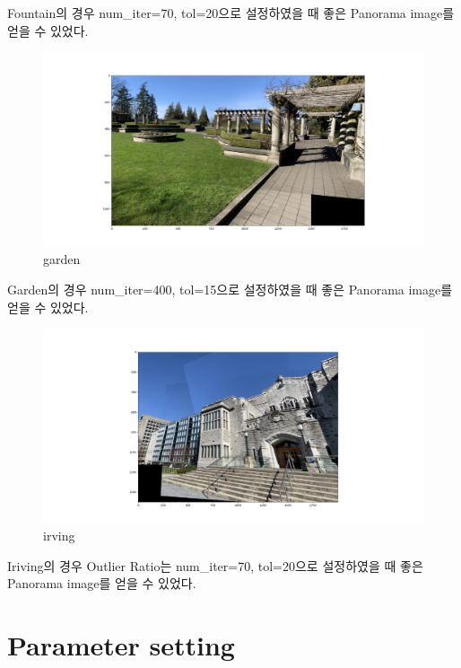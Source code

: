 \documentclass[]{report}
\begin{document}
Fountain의 경우 num\_iter=70, tol=20으로 설정하였을 때 좋은 Panorama image를 얻을 수 있었다. \\

\begin{figure}[ht!]
	\centering
	\includegraphics[width=1\textwidth]{image/garden0-garden3-garden4.png}
	\caption{garden}
	\label{garden0-garden3-garden4}
\end{figure}

Garden의 경우 num\_iter=400, tol=15으로 설정하였을 때 좋은 Panorama image를 얻을 수 있었다. \\

\begin{figure}[ht!]
	\centering
	\includegraphics[width=1\textwidth]{image/irving_out3-irving_out6-irving_out5.png}
	\caption{irving}
	\label{irving_out3-irving_out6-irving_out5}
\end{figure}

Iriving의 경우 Outlier Ratio는 num\_iter=70, tol=20으로 설정하였을 때 좋은 Panorama image를 얻을 수 있었다. \\


\section{Parameter setting}
\end{document}
